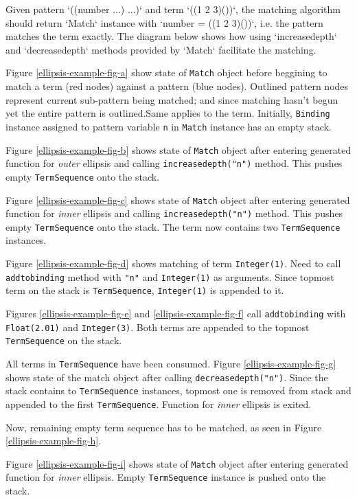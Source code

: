 Given pattern `((number ...) ...)` and term `((1 2 3)())`, the matching algorithm should return `Match` instance with `number = ((1 2 3)())`, i.e. the pattern matches the term exactly. The diagram below shows how using `increasedepth` and `decreasedepth` methods provided by `Match` facilitate the matching. 


Figure \ref{ellipsis-example-fig-a} show state of \texttt{Match} object before beggining to match a term (red nodes) against a pattern (blue nodes). Outlined pattern nodes represent current sub-pattern being matched; and since matching hasn't begun yet the entire pattern is outlined.Same applies to the term. Initially, \texttt{Binding} instance assigned to pattern variable \texttt{n} in \texttt{Match} instance has an empty stack.

Figure \ref{ellipsis-example-fig-b} shows state of \texttt{Match} object after entering generated function for \textit{outer} ellipsis and calling \texttt{increasedepth("n")} method. This pushes empty \texttt{TermSequence} onto the stack.


Figure \ref{ellipsis-example-fig-c} shows state of \texttt{Match} object after entering generated function for \textit{inner} ellipsis and calling \texttt{increasedepth("n")} method. This pushes empty \texttt{TermSequence} onto the stack. The term now contains two \texttt{TermSequence} instances.

Figure \ref{ellipsis-example-fig-d} shows matching of term \texttt{Integer(1)}. Need to call \texttt{addtobinding} method with \texttt{"n"} and \texttt{Integer(1)} as arguments. Since topmost term on the stack is \texttt{TermSequence}, \texttt{Integer(1)} is appended to it.

Figures \ref{ellipsis-example-fig-e} and \ref{ellipsis-example-fig-f} call \texttt{addtobinding} with \texttt{Float(2.01)} and \texttt{Integer(3)}. Both terms are appended to the topmost \texttt{TermSequence} on the stack.

All terms in \texttt{TermSequence} have been consumed. Figure \ref{ellipsis-example-fig-g} shows state of the match object after calling \texttt{decreasedepth("n")}. Since the stack contains to \texttt{TermSequence} instances, topmost one is removed from stack and appended to the first \texttt{TermSequence}. Function for \textit{inner} ellipsis is exited.

Now, remaining empty term sequence has to be matched, as seen in Figure \ref{ellipsis-example-fig-h}.

Figure \ref{ellipsis-example-fig-i} shows state of \texttt{Match} object after entering generated function for \textit{inner} ellipsis. Empty \texttt{TermSequence} instance is pushed onto the stack.

